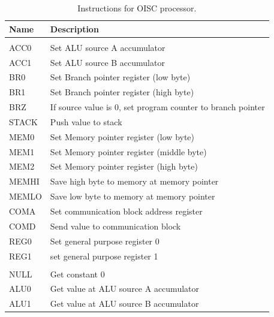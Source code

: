 \begin{longtable}[h!]{| l | p{} |}
	\caption{Instructions for OISC processor.}
	\label{tab:oisc_instructions}\\
	
	\hline 
	\rowcolor[rgb]{0.82,0.82,0.82}
	Name & Description \\\hline
	\endhead		
	
	\arrayrulecolor{black}\hline
	\endfoot
	
	\multicolumn{2}{|c|}{
		\cellcolor[rgb]{0.7,0.7,1}\textit{Destination Addresses}} \\\hline
	\arrayrulecolor[rgb]{0.82,0.82,0.82}
	
	ACC0 & Set ALU source A accumulator \\
	ACC1 & Set ALU source B accumulator \\\hline
	BR0  & Set Branch pointer register (low byte) \\
	BR1  & Set Branch pointer register (high byte) \\
	BRZ  & If source value is 0, set program counter to branch pointer \\\hline
	STACK& Push value to stack \\
	MEM0 & Set Memory pointer register (low byte) \\
	MEM1 & Set Memory pointer register (middle byte) \\
	MEM2 & Set Memory pointer register (high byte) \\
	MEMHI& Save high byte to memory at memory pointer \\
	MEMLO& Save low byte to memory at memory pointer \\\hline
	COMA & Set communication block address register \\
	COMD & Send value to communication block \\\hline
	REG0 & Set general purpose register 0 \\
	REG1 & set general purpose register 1 \\
	
	\arrayrulecolor{black}\hline
	\multicolumn{2}{|c|}{
		\cellcolor[rgb]{0.7,0.7,1}\textit{Source Addresses}} \\\hline
	\arrayrulecolor[rgb]{0.82,0.82,0.82}
	
	NULL & Get constant 0 \\
	ALU0 & Get value at ALU source A accumulator \\
	ALU1 & Get value at ALU source B accumulator \\\hline
	

\end{longtable}

